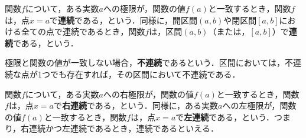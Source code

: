 \begin{definition}[連続]
	関数$f$について，ある実数$a$への極限が，関数の値$f(a)$と一致するとき，関数$f$は，点$x = a$で\textbf{連続}である，という．同様に，開区間$(a, b)$や閉区間$[a ,b]$における全ての点で連続であるとき，関数$f$は，区間$(a, b)$（または，$[a, b]$）で\textbf{連続}である，という．
\end{definition}
\begin{rem*}
	極限と関数の値が一致しない場合，\textbf{不連続}であるという．区間においては，不連続な点が1つでも存在すれば，その区間において不連続である．
\end{rem*}
\begin{rem*}
	関数$f$について，ある実数$a$への右極限が，関数の値$f(a)$と一致するとき，関数$f$は，点$x = a$で\textbf{右連続}である，という．同様に，ある実数$a$への左極限が，関数の値$f(a)$と一致するとき，関数$f$は，点$x = a$で\textbf{左連続}である，という．つまり，右連続かつ左連続であるとき，連続であるといえる．
\end{rem*}
